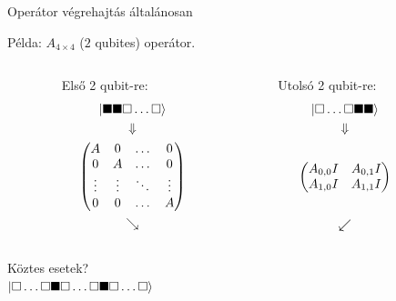 \documentclass[aspectratio=169]{beamer}
\begin{document}
\begin{frame}{Operátor végrehajtás általánosan}

Példa: $A_{4\times{}4}$ ($2$ qubites) operátor.
\vspace{0.5cm}
\begin{columns}
  \begin{column}[t]{0.25\textwidth}
  \end{column}
  \begin{column}[t]{0.2\textwidth}
    Első 2 qubit-re:
    \begin{gather*}
      \ket{\blacksquare{}\blacksquare{}\square{}\dots{}\square{}} \\
      \Downarrow \\
      \begin{pmatrix}
        A & 0  & \dots{} & 0 \\
       0 & A  & \dots{} & 0 \\ 
       \vdots{} & \vdots{}  & \ddots{} & \vdots{} \\
       0 & 0  & \dots{} & A \\
     \end{pmatrix} \\
     \searrow
    \end{gather*}
  \end{column}
  \begin{column}[t]{0.1\textwidth}
  \end{column}
  \begin{column}[t]{0.2\textwidth}
    Utolsó 2 qubit-re:
    \begin{gather*}
      \ket{\square{}\dots{}\square{}\blacksquare{}\blacksquare{}} \\
      \Downarrow \\[16pt]
      \begin{pmatrix}
        A_{0,0} I & A_{0,1} I  \\
        A_{1,0} I & A_{1,1} I  \\
      \end{pmatrix} \\[16pt]
     \swarrow
    \end{gather*}
  \end{column}
  \begin{column}[t]{0.25\textwidth}
  \end{column}
  \end{columns}

\begin{center}
  Köztes esetek?\\
  $\ket{\square{}\dots{}\square{}\blacksquare{}\square{}\dots{}\square{}\blacksquare{}\square{}\dots{}\square{}} $
\end{center}

\end{frame}
\end{document}
